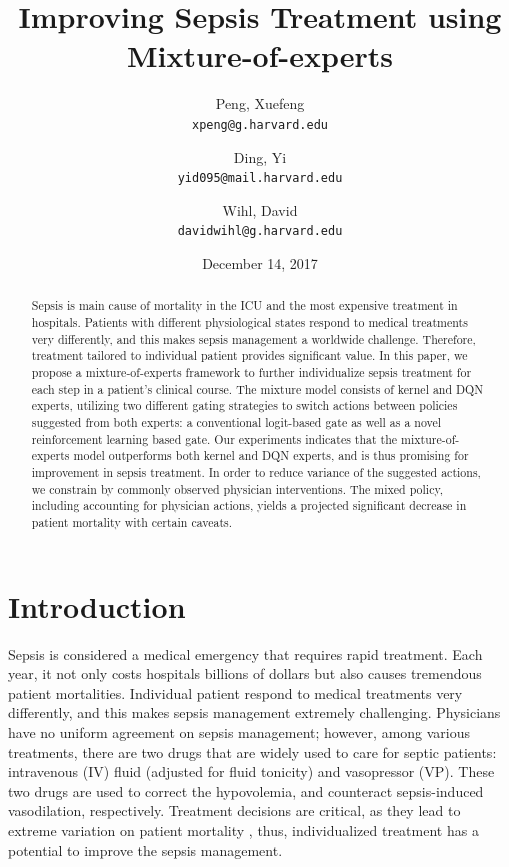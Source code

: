 \documentclass[letterpaper]{article}
\title{Improving Sepsis Treatment using Mixture-of-experts}
\author{Peng, Xuefeng\\
		\texttt{xpeng@g.harvard.edu}
        \and
        Ding, Yi\\
        \texttt{yid095@mail.harvard.edu}
        \and 
        Wihl, David\\
        \texttt{davidwihl@g.harvard.edu}
        }
\date{December 14, 2017}
\begin{document}
\maketitle

\begin{abstract}
Sepsis is main cause of mortality in the ICU and the most expensive treatment in hospitals. Patients with different physiological states respond to medical treatments very differently, and this makes sepsis management a worldwide challenge. Therefore, treatment tailored to individual patient provides significant value. In this paper, we propose a mixture-of-experts framework to further individualize sepsis treatment for each step in a patient's clinical course. The mixture model consists of kernel and DQN experts, utilizing two different gating strategies to switch actions between policies suggested from both experts: a conventional logit-based gate as well as a novel reinforcement learning based gate. Our experiments indicates that the mixture-of-experts model outperforms both kernel and DQN experts, and is thus promising for improvement in sepsis treatment. In order to reduce variance of the suggested actions, we constrain by commonly observed physician interventions. The mixed policy, including accounting for
physician actions, yields a projected significant decrease in patient mortality with certain caveats. 

\end{abstract}

\section{Introduction}

Sepsis is considered a medical emergency that requires rapid treatment. Each year, it not only costs hospitals billions of dollars but also causes tremendous patient mortalities. Individual patient respond to medical treatments very differently, and this makes sepsis management extremely challenging. Physicians have no uniform agreement on sepsis management; however, among various treatments, there are two drugs that are widely used to care for septic patients: intravenous (IV) fluid (adjusted for fluid tonicity) and vasopressor (VP). These two drugs are used to correct the hypovolemia, and counteract sepsis-induced vasodilation, respectively. Treatment decisions are critical, as they lead to extreme variation on patient mortality \cite{waechter2014interaction}, thus, individualized treatment has a potential to improve the sepsis management.
\end{document}
